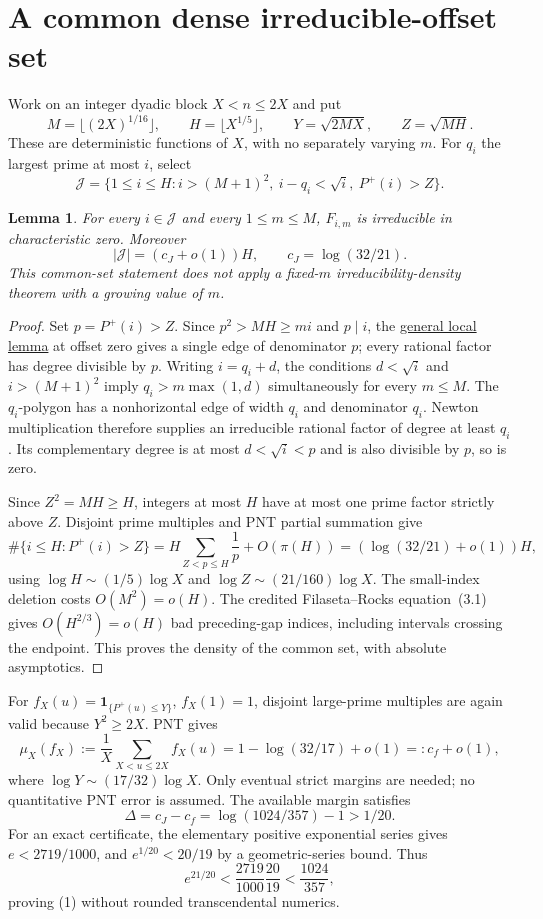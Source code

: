 \documentclass[11pt]{article}
\newtheorem{lemma}[theorem]{Lemma}
\begin{document}
\section{A common dense irreducible-offset set}
Work on an integer dyadic block $X<n\le2X$ and put
\[
 M=\lfloor(2X)^{1/16}\rfloor,\qquad H=\lfloor X^{1/5}\rfloor,
 \qquad Y=\sqrt{2MX},\qquad Z=\sqrt{MH}.
\]
These are deterministic functions of $X$, with no separately varying $m$.
For $q_i$ the largest prime at most $i$, select
\[
 \mathcal J=\{1\le i\le H:i>(M+1)^2,\ i-q_i<\sqrt i,\ P^+(i)>Z\}.
\]
\begin{lemma}\label{lem:common}
For every $i\in\mathcal J$ and every $1\le m\le M$, $F_{i,m}$ is irreducible
in characteristic zero. Moreover
\[
 |\mathcal J|=(c_J+o(1))H,\qquad c_J=\log(32/21).
\]
This common-set statement does not apply a fixed-$m$ irreducibility-density
theorem with a growing value of $m$.
\end{lemma}
\begin{proof}
Set $p=P^+(i)>Z$. Since $p^2>MH\ge mi$ and $p\mid i$, the
\href{QUANTITATIVE_SQUAREFREENESS_ALL_EXPONENTS.tex}{general local lemma}
at offset zero gives a single edge of denominator $p$; every rational
factor has degree divisible by $p$.
Writing $i=q_i+d$, the conditions $d<\sqrt i$ and $i>(M+1)^2$ imply
$q_i>m\max(1,d)$ simultaneously for every $m\le M$.
The $q_i$-polygon has a nonhorizontal edge of width $q_i$ and denominator
$q_i$. Newton multiplication therefore supplies an irreducible rational
factor of degree at least $q_i$. Its complementary degree is at most
$d<\sqrt i<p$ and is also divisible by $p$, so is zero.

Since $Z^2=MH\ge H$, integers at most $H$ have at most one prime factor
strictly above $Z$. Disjoint prime multiples and PNT partial summation give
\[
 \#\{i\le H:P^+(i)>Z\}
 =H\sum_{Z<p\le H}\frac1p+O(\pi(H))
 =(\log(32/21)+o(1))H,
\]
using $\log H\sim(1/5)\log X$ and $\log Z\sim(21/160)\log X$.
The small-index deletion costs $O(M^2)=o(H)$.
The credited Filaseta--Rocks equation~(3.1) gives $O(H^{2/3})=o(H)$
bad preceding-gap indices, including intervals crossing the endpoint.
This proves the density of the common set, with absolute asymptotics.
\end{proof}

For $f_X(u)=\mathbf1_{\{P^+(u)\le Y\}}$, $f_X(1)=1$, disjoint large-prime
multiples are again valid because $Y^2\ge2X$. PNT gives
\[
 \mu_X(f_X):=\frac1X\sum_{X<u\le2X}f_X(u)
 =1-\log(32/17)+o(1)=:c_f+o(1),
\]
where $\log Y\sim(17/32)\log X$.
Only eventual strict margins are needed; no quantitative PNT error is assumed.
The available margin satisfies
\[
 \Delta=c_J-c_f=\log(1024/357)-1>1/20. \tag{1}
\]
For an exact certificate, the elementary positive exponential series gives
$e<2719/1000$, and $e^{1/20}<20/19$ by a geometric-series bound. Thus
\[
 e^{21/20}<\frac{2719}{1000}\frac{20}{19}<\frac{1024}{357},
\]
proving (1) without rounded transcendental numerics.
\end{document}
